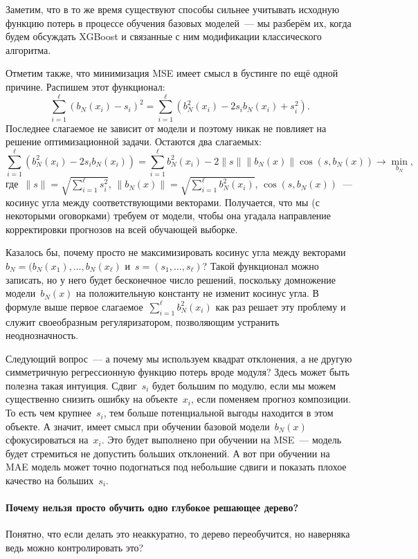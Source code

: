 \documentclass[12pt,fleqn]{article}
\begin{document}
Заметим, что в то же время существуют способы сильнее учитывать исходную функцию потерь
в процессе обучения базовых моделей~--- мы разберём их, когда будем обсуждать XGBoost и связанные с ним
модификации классического алгоритма.

Отметим также, что минимизация MSE имеет смысл в бустинге по ещё одной причине.
Распишем этот функционал:
\[
    \sum_{i = 1}^{\ell}
        (b_N(x_i) - s_i)^2
    =
    \sum_{i = 1}^{\ell}
        (b_N^2(x_i)
        -
        2 s_i b_N(x_i)
        +
        s_i^2).
\]
Последнее слагаемое не зависит от модели и поэтому никак не повлияет на решение оптимизационной задачи.
Остаются два слагаемых:
\[
    \sum_{i = 1}^{\ell}
        (b_N^2(x_i)
        -
        2 s_i b_N(x_i))
    =
    \sum_{i = 1}^{\ell}
        b_N^2(x_i)
    -
    2
    \|s\|
    \|b_N(x)\|
    \cos(s, b_N(x))
    \to
    \min_{b_N},
\]
где~$\|s\| = \sqrt{\sum_{i = 1}^{\ell} s_i^2}$,
$\|b_N(x)\| = \sqrt{\sum_{i = 1}^{\ell} b_N^2(x_i)}$,
$\cos(s, b_N(x))$~--- косинус угла между соответствующими векторами.
Получается, что мы (с некоторыми оговорками) требуем от модели, чтобы она угадала направление
корректировки прогнозов на всей обучающей выборке.

Казалось бы, почему просто не максимизировать косинус угла между векторами~$b_N = (b_N(x_1), \dots, b_N(x_\ell)$
и~$s = (s_1, \dots, s_\ell)$?
Такой функционал можно записать, но у него будет бесконечное число решений, поскольку домножение
модели~$b_N(x)$ на положительную константу не изменит косинус угла.
В формуле выше первое слагаемое~$\sum_{i = 1}^{\ell} b_N^2(x_i)$
как раз решает эту проблему и служит своеобразным регуляризатором,
позволяющим устранить неоднозначность.

Следующий вопрос~--- а почему мы используем квадрат отклонения, а не другую симметричную
регрессионную функцию потерь вроде модуля?
Здесь может быть полезна такая интуиция.
Сдвиг~$s_i$ будет большим по модулю, если мы можем существенно снизить ошибку на объекте~$x_i$,
если поменяем прогноз композиции.
То есть чем крупнее~$s_i$, тем больше потенциальной выгоды находится в этом объекте.
А значит, имеет смысл при обучении базовой модели~$b_N(x)$ сфокусироваться на~$x_i$.
Это будет выполнено при обучении на MSE~--- модель будет стремиться не допустить больших отклонений.
А вот при обучении на MAE модель может точно подогнаться под небольшие сдвиги и показать плохое качество на больших~$s_i$.


\paragraph{Почему нельзя просто обучить одно глубокое решающее дерево?}
Понятно, что если делать это неаккуратно, то дерево переобучится, но наверняка ведь можно
контролировать это?
\end{document}
